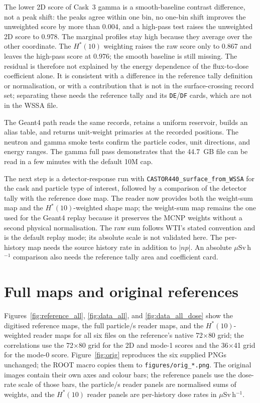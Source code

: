 \documentclass[11pt,a4paper]{article}
\begin{document}
The lower 2D score of Cask~3 gamma is a smooth-baseline contrast difference, not
a peak shift: the peaks agree within one bin, no one-bin shift improves the
unweighted score by more than 0.004, and a high-pass test raises the unweighted
2D score to 0.978.  The marginal profiles stay high because they average over
the other coordinate.  The $H^*(10)$ weighting raises the raw score only to
0.867 and leaves the high-pass score at 0.976; the smooth baseline is still
missing.  The residual is therefore not explained by the energy dependence of
the flux-to-dose coefficient alone.  It is consistent with a difference in the
reference tally definition or normalisation, or with a contribution that is not
in the surface-crossing record set; separating these needs the reference tally
and its \texttt{DE}/\texttt{DF} cards, which are not in the WSSA file.

The Geant4 path reads the same records, retains a uniform reservoir, builds an
alias table, and returns unit-weight primaries at the recorded positions.  The
neutron and gamma smoke tests confirm the particle codes, unit directions, and
energy ranges.  The gamma full pass demonstrates that the 44.7~GB file can be
read in a few minutes with the default 10M cap.

The next step is a detector-response run with
\texttt{CASTOR440\_surface\_from\_WSSA} for the cask and particle type of
interest, followed by a comparison of the detector tally with the reference
dose map.  The reader now provides both the weight-sum map and the
$H^*(10)$-weighted shape map; the weight-sum map remains the one used for the
Geant4 replay because it preserves the MCNP weights without a second physical
normalisation.  The raw sum follows WTI's stated convention and is the default
replay mode; its absolute scale is not validated here.  The per-history map
needs the source history rate in addition to $|np|$.  An absolute
$\mu$Sv\,h$^{-1}$ comparison also needs the reference tally area and coefficient
card.

\appendix
\section{Full maps and original references}\label{app:maps}

Figures~\ref{fig:reference_all}, \ref{fig:data_all}, and
\ref{fig:data_all_dose} show the digitised reference maps, the full particle/s
reader maps, and the $H^*(10)$-weighted reader maps for all six files on the
reference's native 72$\times$80 grid; the correlations use the 72$\times$80
grid for the 2D and mode-1 scores and the 36$\times$41 grid for the mode-0
score.
Figure~\ref{fig:orig} reproduces the six supplied PNGs unchanged; the ROOT macro
copies them to \texttt{figures/orig\_*.png}.  The original images contain their
own axes and colour bars; the reference panels use the dose-rate scale of those
bars, the particle/s reader panels are normalised sums of weights, and the
$H^*(10)$ reader panels are per-history dose rates in $\mu$Sv\,h$^{-1}$.
\end{document}

